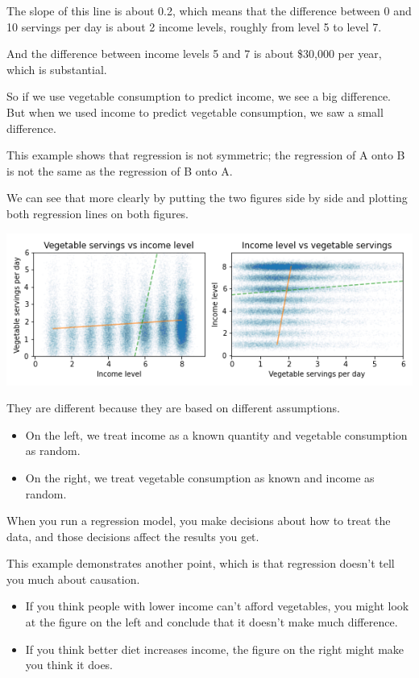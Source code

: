 The slope of this line is about 0.2, which means that the difference
between 0 and 10 servings per day is about 2 income levels, roughly from
level 5 to level 7.

And the difference between income levels 5 and 7 is about \$30,000 per
year, which is substantial.

So if we use vegetable consumption to predict income, we see a big
difference. But when we used income to predict vegetable consumption, we
saw a small difference.

This example shows that regression is not symmetric; the regression of A
onto B is not the same as the regression of B onto A.

We can see that more clearly by putting the two figures side by side and
plotting both regression lines on both figures.

\includegraphics{figs/fig09-03.png}

They are different because they are based on different assumptions.

\begin{itemize}
\item
  On the left, we treat income as a known quantity and vegetable
  consumption as random.
\item
  On the right, we treat vegetable consumption as known and income as
  random.
\end{itemize}

When you run a regression model, you make decisions about how to treat
the data, and those decisions affect the results you get.

This example demonstrates another point, which is that regression
doesn't tell you much about causation.

\begin{itemize}
\item
  If you think people with lower income can't afford vegetables, you
  might look at the figure on the left and conclude that it doesn't make
  much difference.
\item
  If you think better diet increases income, the figure on the right
  might make you think it does.
\end{itemize}

